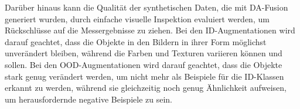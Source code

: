 Darüber hinaus kann die Qualität der synthetischen Daten, die mit DA-Fusion generiert wurden, durch einfache visuelle Inspektion evaluiert werden, um Rückschlüsse auf die Messergebnisse zu ziehen. Bei den ID-Augmentationen wird darauf geachtet, dass die Objekte in den Bildern in ihrer Form möglichst unverändert bleiben, während die Farben und Texturen variieren können und sollen. Bei den OOD-Augmentationen wird darauf geachtet, dass die Objekte stark genug verändert werden, um nicht mehr als Beispiele für die ID-Klassen erkannt zu werden, während sie gleichzeitig noch genug Ähnlichkeit aufweisen, um herausfordernde negative Beispiele zu sein.